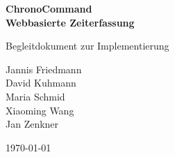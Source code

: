 \documentclass[hidelinks]{scrartcl}
\begin{document}
	\setlength{\parindent}{0pt}

	\begin{titlepage}

		\begin{center}
			\huge \bfseries ChronoCommand \\
			\large  Webbasierte Zeiterfassung
		\end{center}

		\begin{center}
				\large Begleitdokument zur Implementierung\\
		\end{center}

		\begin{center}
			Jannis Friedmann \\
			David Kuhmann \\
			Maria Schmid \\
			Xiaoming Wang \\
			Jan Zenkner \\

		\end{center}

		\begin{center}
			\large \today
		\end{center}
	
		\vfill
	\end{titlepage}
	\thispagestyle{empty}


	\clearpage
	\pagestyle{empty}
	\tableofcontents

	\clearpage
	\pagestyle{plain}
	\setcounter{page}{1}

	
	
	
	
	
\end{document}
